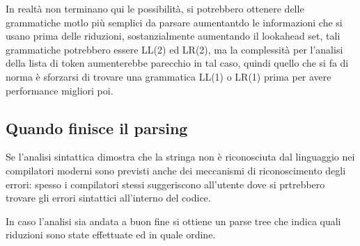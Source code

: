 \documentclass[class=book, crop=false, oneside, 12pt]{standalone}
\begin{document}
In realtà non terminano qui le possibilità, si potrebbero ottenere delle grammatiche motlo più semplici da parsare aumentantdo le informazioni che si usano prima delle riduzioni, sostanzialmente aumentando il lookahead set, tali grammatiche potrebbero essere LL(2) ed LR(2), ma la complessità per l'analisi della lista di token aumenterebbe parecchio in tal caso, quindi quello che si fa di norma è sforzarsi di trovare una grammatica LL(1) o LR(1) prima per avere performance migliori poi.

\subsection{Quando finisce il parsing}
Se l'analisi sintattica dimostra che la stringa non è riconosciuta dal linguaggio nei compilatori moderni sono previsti anche dei meccanismi di riconoscimento degli errori: spesso i compilatori stessi suggeriscono all'utente dove si prtrebbero trovare gli errori sintattici all'interno del codice.

In caso l'analisi sia andata a buon fine si ottiene un parse tree che indica quali riduzioni sono state effettuate ed in quale ordine.
\end{document}
